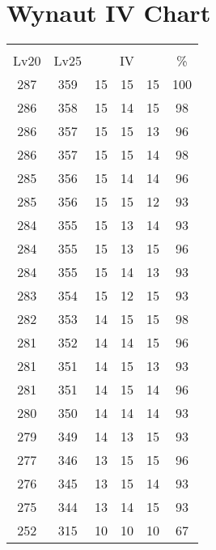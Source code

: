 \documentclass{article}%
\begin{document}
%
\normalsize%
\section{Wynaut IV Chart}%
\label{sec:Wynaut IV Chart}%
\renewcommand{\arraystretch}{1.5}%
\begin{tabular}{|c|c|c|c|c|c|}%
\hline%
\multicolumn{6}{|c|}{\textcolor{white}{ 
\linebreak{Wynaut}
}%
\cellcolor{black}}\\%
\multicolumn{1}{|c}{Lv20}&\multicolumn{1}{c|}{Lv25}&\multicolumn{3}{c|}{IV}&\multicolumn{1}{|c|}{\%}\\%
\hline%
\rowcolor{color100}%
287&359&15&15&15&100\\%
\hline%
\rowcolor{color98}%
286&358&15&14&15&98\\%
\hline%
\rowcolor{color96}%
286&357&15&15&13&96\\%
\hline%
\rowcolor{color98}%
286&357&15&15&14&98\\%
\hline%
\rowcolor{color96}%
285&356&15&14&14&96\\%
\hline%
\rowcolor{color93}%
285&356&15&15&12&93\\%
\hline%
\rowcolor{color93}%
284&355&15&13&14&93\\%
\hline%
\rowcolor{color96}%
284&355&15&13&15&96\\%
\hline%
\rowcolor{color93}%
284&355&15&14&13&93\\%
\hline%
\rowcolor{color93}%
283&354&15&12&15&93\\%
\hline%
\rowcolor{color98}%
282&353&14&15&15&98\\%
\hline%
\rowcolor{color96}%
281&352&14&14&15&96\\%
\hline%
\rowcolor{color93}%
281&351&14&15&13&93\\%
\hline%
\rowcolor{color96}%
281&351&14&15&14&96\\%
\hline%
\rowcolor{color93}%
280&350&14&14&14&93\\%
\hline%
\rowcolor{color93}%
279&349&14&13&15&93\\%
\hline%
\rowcolor{color96}%
277&346&13&15&15&96\\%
\hline%
\rowcolor{color93}%
276&345&13&15&14&93\\%
\hline%
\rowcolor{color93}%
275&344&13&14&15&93\\%
\hline%
\rowcolor{color91}%
252&315&10&10&10&67\\%
\end{tabular}

%
\end{document}
